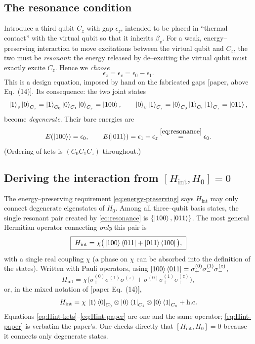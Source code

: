 \documentclass[11pt,a4paper]{article}
\theoremstyle{definition}
\theoremstyle{remark}
\begin{document}
\subsection{The resonance condition}
Introduce a third qubit $C_z$ with gap $\epsilon_z$, intended to be
placed in ``thermal contact'' with the virtual qubit so that it inherits
$\beta_v$. For a weak, energy--preserving interaction to move excitations
between the virtual qubit and $C_z$, the two must be \emph{resonant}:
the energy released by de--exciting the virtual qubit must exactly
excite $C_z$. Hence we \emph{choose}
\begin{equation}
\boxed{\;\epsilon_z = \epsilon_v = \epsilon_0 - \epsilon_1 .\;}
\label{eq:resonance}
\end{equation}
This is a design equation, imposed by hand on the fabricated gaps
[paper, above Eq.~(14)]. Its consequence: the two joint states
\begin{equation}
\ket{1}_v\ket{0}_{C_z}=\ket{1}_{C_0}\ket{0}_{C_1}\ket{0}_{C_z}
=\ket{100},\qquad
\ket{0}_v\ket{1}_{C_z}=\ket{0}_{C_0}\ket{1}_{C_1}\ket{1}_{C_z}
=\ket{011},
\end{equation}
become \emph{degenerate}. Their bare energies are
\begin{equation}
E(\ket{100}) = \epsilon_0,\qquad
E(\ket{011}) = \epsilon_1 + \epsilon_z
\overset{\eqref{eq:resonance}}{=}\epsilon_0 .
\end{equation}
(Ordering of kets is $(C_0C_1C_z)$ throughout.)

\subsection{Deriving the interaction from \texorpdfstring{$[H_{\mathrm{int}},H_0]=0$}{[Hint,H0]=0}}
The energy--preserving requirement \eqref{eq:energy-preserving} says
$H_{\mathrm{int}}$ may only connect degenerate eigenstates of $H_0$.
Among all three--qubit basis states, the single resonant pair created by
\eqref{eq:resonance} is $\{\ket{100},\ket{011}\}$. The most general
Hermitian operator connecting \emph{only} this pair is
\begin{equation}
\boxed{\;
H_{\mathrm{int}} = \chi\big(\ket{100}\bra{011}
+ \ket{011}\bra{100}\big),
\;}
\label{eq:Hint-kets}
\end{equation}
with a single real coupling $\chi$ (a phase on $\chi$ can be absorbed
into the definition of the states). Written with Pauli operators, using
$\ket{100}\bra{011}=\sigma_+^{(0)}\sigma_-^{(1)}\sigma_-^{(z)}$,
\begin{equation}
H_{\mathrm{int}} = \chi\Big(
\sigma_+^{(0)}\sigma_-^{(1)}\sigma_-^{(z)}
+ \sigma_-^{(0)}\sigma_+^{(1)}\sigma_+^{(z)}\Big),
\label{eq:Hint-pauli}
\end{equation}
or, in the mixed notation of [paper Eq.~(14)],
\begin{equation}
H_{\mathrm{int}} = \chi\,\ket{1}\bra{0}_{C_0}\otimes
\ket{0}\bra{1}_{C_1}\otimes\ket{0}\bra{1}_{C_z} + \mathrm{h.c.}
\label{eq:Hint-paper}
\end{equation}
Equations \eqref{eq:Hint-kets}--\eqref{eq:Hint-paper} are one and the
same operator; \eqref{eq:Hint-paper} is verbatim the paper's. One checks
directly that $[H_{\mathrm{int}},H_0]=0$ because it connects only
degenerate states.
\end{document}
